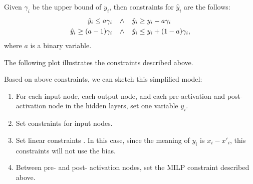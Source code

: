\documentclass{llncs}
\begin{document}
	Given  $\gamma_i$ be the upper bound of $y_i$, then constraints for $\hat{y}_i$ are the follows:\begin{align*}
		\hat{y}_i \leq a \gamma_i \hspace*{2ex} &\wedge \hspace*{2ex}\hat{y}_i \geq y_i - a \gamma_i\\
		\hat{y}_i \geq (a-1) \gamma_i  \hspace*{2ex} &\wedge \hspace*{2ex} \hat{y}_i \leq y_i + (1-a) \gamma_i,
	\end{align*} where $a$ is a binary variable.
	
	
	The following plot illustrates the constraints described above.
	
	\hspace*{10ex}
	
   Based on above constraints, we can sketch this simplified model:
\begin{enumerate}
	\item For each input node, each output node, and each pre-activation and post-activation node in the hidden layers,  set one variable $y_i$. 
	\item Set constraints for input nodes.
	\item Set linear constraints . In this case, since the meaning of $y_i$ is $x_i-x'_i$, this constraints will not use the bias.
	\item Between pre- and post- activation nodes, set the MILP constraint described above.
\end{enumerate}
	
\end{document}
